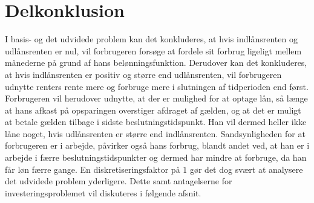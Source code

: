 \section{Delkonklusion}
I basis- og det udvidede problem kan det konkluderes, at hvis indlånsrenten og udlånsrenten er nul, vil forbrugeren forsøge at fordele sit forbrug ligeligt mellem månederne på grund af hans belønningsfunktion. Derudover kan det konkluderes, at hvis indlånsrenten er positiv og større end udlånsrenten, vil forbrugeren udnytte renters rente mere og forbruge mere i slutningen af tidperioden end først. Forbrugeren vil herudover udnytte, at der er mulighed for at optage lån, så længe at hans afkast på opsparingen overstiger afdraget af gælden, og at det er muligt at betale gælden tilbage i sidste beslutningstidspunkt. Han vil dermed heller ikke låne noget, hvis udlånsrenten er større end indlånsrenten. Sandsynligheden for at forbrugeren er i arbejde, påvirker også hans forbrug, blandt andet ved, at han er i arbejde i færre beslutningstidspunkter og dermed har mindre at forbruge, da han får løn færre gange. En diskretiseringsfaktor på $1$ gør det dog svært at analysere det udvidede problem yderligere. Dette samt antagelserne for investeringsproblemet vil diskuteres i følgende afsnit. 


